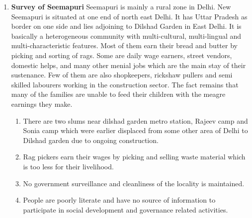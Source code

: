 \begin{enumerate}
\item \textbf {Survey of Seemapuri}
Seemapuri is mainly a rural zone in Delhi. New Seemapuri is situated at one end of north east Delhi. It has Uttar Pradesh as border on one side and lies adjoining to Dilshad Garden in East Delhi. It is basically a heterogeneous community with multi-cultural, multi-lingual and multi-characteristic features. Most of them earn their bread and butter by picking and sorting of rags. Some are daily wage earners, street vendors, domestic helps, and many other menial jobs which are the main stay of their sustenance. Few of them are also shopkeepers, rickshaw pullers and semi skilled labourers working in the construction sector. The fact remains that many of the families are unable to feed their children with the meagre earnings they make.
\begin{enumerate}
\item There are two slums near dilshad garden metro station, Rajeev camp and Sonia camp which were earlier displaced from some other area of Delhi to Dilshad garden due to ongoing construction.
\item Rag pickers earn their wages by picking and selling waste material which is too less for their livelihood.
\item No government surveillance and cleanliness of the locality is maintained.
\item People are poorly literate and have no source of information to participate in social development and governance related activities.
\end{enumerate}

\end{enumerate}



